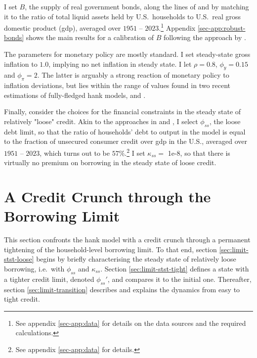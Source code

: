 \documentclass[12pt]{article} %
\numberwithin{equation}{section} %
\numberwithin{figure}{section}
\numberwithin{table}{section}
\begin{document}
I set $B$, the supply of real government bonds, along the lines of \textcite{mckay2016} and \textcite{gl2017} by matching it to the ratio of total liquid assets held by U.S.~households to U.S.~real gross domestic product (\Gls{gdp}), averaged over $1951$ -- $2023$.\footnote{See appendix \ref{sec-app:data} for details on the data sources and the required calculations.} Appendix \ref{sec-app:robust-bonds} shows the main results for a calibration of $B$ following the approach by \textcite{bayer2023}.

The parameters for monetary policy are mostly standard. I set steady-state gross inflation to $1.0$, implying no net inflation in steady state. I let $\rho = 0.8$, $\phi_y = 0.15$ and $\phi_{\pi} = 2$. The latter is arguably a strong reaction of monetary policy to inflation deviations, but lies within the range of values found in two recent estimations of fully-fledged \Gls{hank} models, \textcite{boehl2022} and \textcite{bayer2023}.

Finally, consider the choices for the financial constraints in the steady state of relatively "loose" credit. Akin to the approaches in \textcite{gl2017} and \textcite{bayer2023}, I select $\phi_{ss}$, the loose debt limit, so that the ratio of households' debt to output in the model is equal to the fraction of unsecured consumer credit over \Gls{gdp} in the U.S., averaged over $1951$ -- $2023$, which turns out to be $57\%$.\footnote{See appendix \ref{sec-app:data} for details.} I set $\kappa_{ss} =$ 1e-8, so that there is virtually no premium on borrowing in the steady state of loose credit. %

\section{A Credit Crunch through the Borrowing Limit}
\label{sec:limit}

This section confronts the \Gls{hank} model with a credit crunch through a permanent tightening of the household-level borrowing limit. To that end, section \ref{sec:limit-stst-loose} begins by briefly characterising the steady state of relatively loose borrowing, i.e.~with $\phi_{ss}$ and $\kappa_{ss}$. Section \ref{sec:limit-stst-tight} defines a state with a tighter credit limit, denoted $\phi_{ss}'$, and compares it to the initial one. Thereafter, section \ref{sec:limit-transition} describes and explains the dynamics from easy to tight credit.
\end{document}
